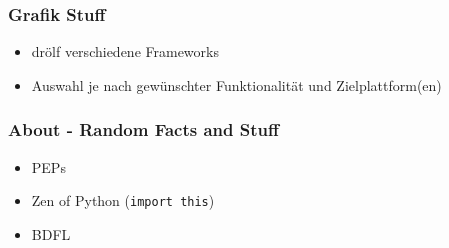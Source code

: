 \documentclass{beamer}
\begin{document}
\begin{frame}
	\frametitle{Grafik Stuff}
	\begin{itemize}
		\item drölf verschiedene Frameworks
		\item Auswahl je nach gewünschter Funktionalität und Zielplattform(en)
	\end{itemize}
\end{frame}

\begin{frame}
	\frametitle{About - Random Facts and Stuff}
	\begin{itemize}
		\item PEPs
		\item Zen of Python (\texttt{import this})
		\item BDFL
	\end{itemize}
\end{frame}
	
\end{document}
